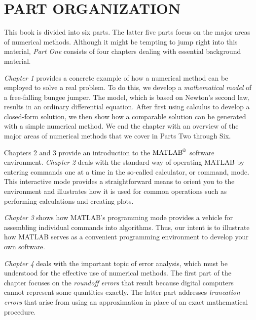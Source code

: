 \documentclass[../main.tex]{subfiles}
\begin{document}
\bigskip
\section{PART ORGANIZATION}
\label{cha:cha2}
This book is divided into six parts. The latter five parts focus on the major areas of numerical methods. Although it might be tempting to jump right into this material, \textsl{Part One} consists of four chapters dealing with essential background material.


\textsl{Chapter 1} provides a concrete example of how a numerical method can be employed
to solve a real problem. To do this, we develop a \textsl{mathematical model} of a free-falling
bungee jumper. The model, which is based on Newton’s second law, results in an ordinary
differential equation. After first using calculus to develop a closed-form solution, we then
show how a comparable solution can be generated with a simple numerical method. We
end the chapter with an overview of the major areas of numerical methods that we cover in
Parts Two through Six.


Chapters 2 and 3 provide an introduction to the $\text{MATLAB}^\copyright$ software environment.
\textsl{Chapter 2} deals with the standard way of operating MATLAB by entering commands one
at a time in the so-called calculator, or command, mode. This interactive mode provides a
straightforward means to orient you to the environment and illustrates how it is used for
common operations such as performing calculations and creating plots.

\textsl{Chapter 3} shows how MATLAB’s programming mode provides a vehicle for assembling individual commands into algorithms. Thus, our intent is to illustrate how MATLAB
serves as a convenient programming environment to develop your own software.


\textsl{Chapter 4} deals with the important topic of error analysis, which must be understood
for the effective use of numerical methods. The first part of the chapter focuses on the
\textsl{roundoff errors} that result because digital computers cannot represent some quantities
exactly. The latter part addresses \textsl{truncation errors} that arise from using an approximation
in place of an exact mathematical procedure.





\blankpage
\end{document}
